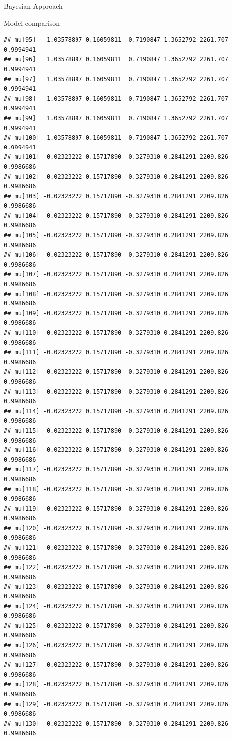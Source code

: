\documentclass[
  ignorenonframetext,
]{beamer}
\begin{document}
\begin{frame}[fragile]{Bayesian Approach}
\begin{block}{Model comparison}
\begin{verbatim}
## mu[95]   1.03578897 0.16059811  0.7190847 1.3652792 2261.707 0.9994941
## mu[96]   1.03578897 0.16059811  0.7190847 1.3652792 2261.707 0.9994941
## mu[97]   1.03578897 0.16059811  0.7190847 1.3652792 2261.707 0.9994941
## mu[98]   1.03578897 0.16059811  0.7190847 1.3652792 2261.707 0.9994941
## mu[99]   1.03578897 0.16059811  0.7190847 1.3652792 2261.707 0.9994941
## mu[100]  1.03578897 0.16059811  0.7190847 1.3652792 2261.707 0.9994941
## mu[101] -0.02323222 0.15717890 -0.3279310 0.2841291 2209.826 0.9986686
## mu[102] -0.02323222 0.15717890 -0.3279310 0.2841291 2209.826 0.9986686
## mu[103] -0.02323222 0.15717890 -0.3279310 0.2841291 2209.826 0.9986686
## mu[104] -0.02323222 0.15717890 -0.3279310 0.2841291 2209.826 0.9986686
## mu[105] -0.02323222 0.15717890 -0.3279310 0.2841291 2209.826 0.9986686
## mu[106] -0.02323222 0.15717890 -0.3279310 0.2841291 2209.826 0.9986686
## mu[107] -0.02323222 0.15717890 -0.3279310 0.2841291 2209.826 0.9986686
## mu[108] -0.02323222 0.15717890 -0.3279310 0.2841291 2209.826 0.9986686
## mu[109] -0.02323222 0.15717890 -0.3279310 0.2841291 2209.826 0.9986686
## mu[110] -0.02323222 0.15717890 -0.3279310 0.2841291 2209.826 0.9986686
## mu[111] -0.02323222 0.15717890 -0.3279310 0.2841291 2209.826 0.9986686
## mu[112] -0.02323222 0.15717890 -0.3279310 0.2841291 2209.826 0.9986686
## mu[113] -0.02323222 0.15717890 -0.3279310 0.2841291 2209.826 0.9986686
## mu[114] -0.02323222 0.15717890 -0.3279310 0.2841291 2209.826 0.9986686
## mu[115] -0.02323222 0.15717890 -0.3279310 0.2841291 2209.826 0.9986686
## mu[116] -0.02323222 0.15717890 -0.3279310 0.2841291 2209.826 0.9986686
## mu[117] -0.02323222 0.15717890 -0.3279310 0.2841291 2209.826 0.9986686
## mu[118] -0.02323222 0.15717890 -0.3279310 0.2841291 2209.826 0.9986686
## mu[119] -0.02323222 0.15717890 -0.3279310 0.2841291 2209.826 0.9986686
## mu[120] -0.02323222 0.15717890 -0.3279310 0.2841291 2209.826 0.9986686
## mu[121] -0.02323222 0.15717890 -0.3279310 0.2841291 2209.826 0.9986686
## mu[122] -0.02323222 0.15717890 -0.3279310 0.2841291 2209.826 0.9986686
## mu[123] -0.02323222 0.15717890 -0.3279310 0.2841291 2209.826 0.9986686
## mu[124] -0.02323222 0.15717890 -0.3279310 0.2841291 2209.826 0.9986686
## mu[125] -0.02323222 0.15717890 -0.3279310 0.2841291 2209.826 0.9986686
## mu[126] -0.02323222 0.15717890 -0.3279310 0.2841291 2209.826 0.9986686
## mu[127] -0.02323222 0.15717890 -0.3279310 0.2841291 2209.826 0.9986686
## mu[128] -0.02323222 0.15717890 -0.3279310 0.2841291 2209.826 0.9986686
## mu[129] -0.02323222 0.15717890 -0.3279310 0.2841291 2209.826 0.9986686
## mu[130] -0.02323222 0.15717890 -0.3279310 0.2841291 2209.826 0.9986686

\end{verbatim}
\end{block}
\end{frame}
\end{document}
